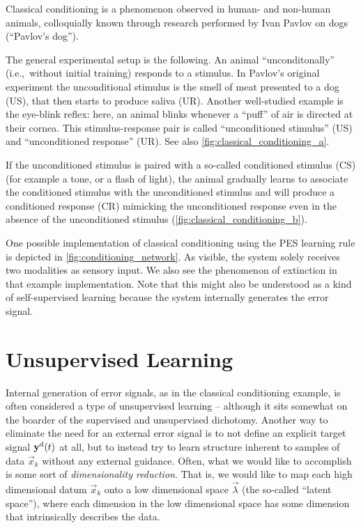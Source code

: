 \documentclass[10pt,letterpaper,oneside]{article}
\begin{document}
Classical conditioning is a phenomenon observed in human- and non-human animals, colloquially known through research performed by Ivan Pavlov on dogs (\enquote{Pavlov's dog}).

The general experimental setup is the following. An animal \enquote{unconditonally} (i.e.,~without initial training) responds to a stimulus. In Pavlov's original experiment the unconditional stimulus is the smell of meat presented to a dog (US), that then starts to produce saliva (UR). Another well-studied example is the eye-blink reflex: here, an animal blinks whenever a \enquote{puff} of air is directed at their cornea. This stimulus-response pair is called \enquote{unconditioned stimulus} (US) and \enquote{unconditioned response} (UR). See also \cref{fig:classical_conditioning_a}.

If the unconditioned stimulus is paired with a so-called conditioned stimulus (CS) (for example a tone, or a flash of light), the animal gradually learns to associate the conditioned stimulus with the unconditioned stimulus and will produce a conditioned response (CR) mimicking the unconditioned response even in the absence of the unconditioned stimulus (\cref{fig:classical_conditioning_b}).

One possible implementation of classical conditioning using the PES learning rule is depicted in \cref{fig:conditioning_network}. As visible, the system solely receives two modalities as sensory input. We also see the phenomenon of extinction in that example implementation. Note that this might also be understood as a kind of self-supervised learning because the system internally generates the error signal.

\section{Unsupervised Learning}

Internal generation of error signals, as in the classical conditioning example, is often considered a type of unsupervised learning -- although it sits somewhat on the boarder of the supervised and unsupervised dichotomy. Another way to eliminate the need for an external error signal is to not define an explicit target signal ${\mathbf{y}}^\mathrm{d}(t)$ at all, but to instead try to learn structure inherent to samples of data $\vec x_k$ without any external guidance. Often, what we would like to accomplish is some sort of \emph{dimensionality reduction}. That is, we would like to map each high dimensional datum $\vec x_k$ onto a low dimensional space $\vec \lambda$ (the so-called \enquote{latent space}), where each dimension in the low dimensional space has some dimension that intrinsically describes the data.
\end{document}
